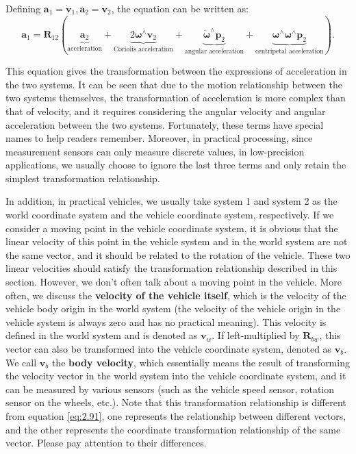 Defining $\mathbf{a}_1 = \dot{\mathbf{v}}_1, \mathbf{a}_2 = \dot{\mathbf{v}}_2$, the equation can be written as:
\begin{equation}\label{key}
	\mathbf{a}_1 = \mathbf{R}_{12} (\underbrace{\mathbf{a}_2}_{\text{acceleration}} + 
	\underbrace{2\boldsymbol{\omega}^\wedge \mathbf{v}_2}_{\text{Coriolis acceleration}} + 
	\underbrace{\dot{\boldsymbol{\omega}}^\wedge \mathbf{p}_2}_{\text{angular acceleration}} + 
	\underbrace{{\boldsymbol{\omega}^\wedge}{\boldsymbol{\omega}^\wedge}{\mathbf{p}_2}}_{\text{centripetal
			acceleration}} ).
\end{equation}

This equation gives the transformation between the expressions of acceleration in the two systems. It can be seen that due to the motion relationship between the two systems themselves, the transformation of acceleration is more complex than that of velocity, and it requires considering the angular velocity and angular acceleration between the two systems. Fortunately, these terms have special names to help readers remember. Moreover, in practical processing, since measurement sensors can only measure discrete values, in low-precision applications, we usually choose to ignore the last three terms and only retain the simplest transformation relationship.

In addition, in practical vehicles, we usually take system 1 and system 2 as the world coordinate system and the vehicle coordinate system, respectively. If we consider a moving point in the vehicle coordinate system, it is obvious that the linear velocity of this point in the vehicle system and in the world system are not the same vector, and it should be related to the rotation of the vehicle. These two linear velocities should satisfy the transformation relationship described in this section. However, we don't often talk about a moving point in the vehicle. More often, we discuss the \textbf{velocity of the vehicle itself}, which is the velocity of the vehicle body origin in the world system (the velocity of the vehicle origin in the vehicle system is always zero and has no practical meaning). This velocity is defined in the world system and is denoted as $\mathbf{v}_w$. If left-multiplied by $\mathbf{R}_{bw}$, this vector can also be transformed into the vehicle coordinate system, denoted as $\mathbf{v}_b$. We call $\mathbf{v}_b$ the \textbf{body velocity}, which essentially means the result of transforming the velocity vector in the world system into the vehicle coordinate system, and it can be measured by various sensors (such as the vehicle speed sensor, rotation sensor on the wheels, etc.). Note that this transformation relationship is different from equation \eqref{eq:2.91}, one represents the relationship between different vectors, and the other represents the coordinate transformation relationship of the same vector. Please pay attention to their differences.

